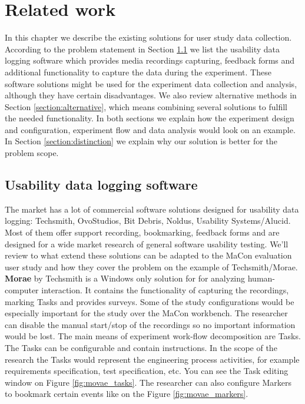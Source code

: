 \chapter{Related work}\label{chapter:related_work}
In this chapter we describe the existing solutions for user study data collection. According to the problem statement in Section \ref{section:software} we list the usability data logging software which provides media recordings capturing, feedback forms and additional functionality to capture the data during the experiment. These software solutions might be used for the experiment data collection and analysis, although they have certain disadvantages. We also review alternative methods in Section \ref{section:alternative}, which means combining several solutions to fulfill the needed functionality. In both sections we explain how the experiment design and configuration, experiment flow and data analysis would look on an example. In Section \ref{section:distinction} we explain why our solution is better for the problem scope.\\   

\section{Usability data logging software}\label{section:software}
The market has a lot of commercial software solutions designed for usability data logging: Techsmith, OvoStudios, Bit Debris, Noldus, Usability Systems/Alucid. Most of them offer support recording, bookmarking, feedback forms and are designed for a wide market research of general software usability testing. We'll review to what extend these solutions can be adapted to the MaCon evaluation user study and how they cover the problem on the example of Techsmith/Morae.\\

\textbf{Morae} by Techsmith \cite{morae} is a Windows only solution for for analyzing human-computer interaction. It contains the functionality of capturing the recordings, marking Tasks and provides surveys. Some of the study configurations would be especially important for the study over the MaCon workbench. The researcher can disable the manual start/stop of the recordings so no important information would be lost. The main means of experiment work-flow decomposition are Tasks. The Tasks can be configurable and contain instructions. In the scope of the research the Tasks would represent the engineering process activities, for example requirements specification, test specification, etc. You can see the Task editing window on Figure \ref{fig:movae_tasks}. The researcher can also configure Markers to bookmark certain events like on the Figure \ref{fig:movae_markers}.\\

